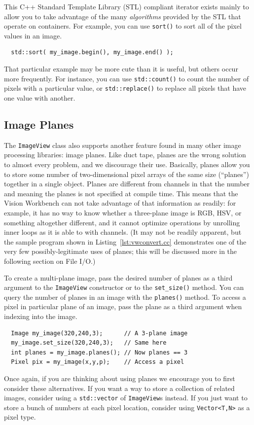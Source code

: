 This C++ Standard Template Library (STL) compliant iterator exists
mainly to allow you to take advantage of the many {\it algorithms}
provided by the STL that operate on containers.  For example, you can
use \verb#sort()# to sort all of the pixel values in an image.
\begin{verbatim}
  std::sort( my_image.begin(), my_image.end() );
\end{verbatim}
That particular example may be more cute than it is useful, but others
occur more frequently.  For instance, you can use \verb#std::count()# 
to count the number of pixels with a particular value, or
\verb#std::replace()# to replace all pixels that have one value with
another.

\subsection{Image Planes}

The \verb#ImageView# class also supports another feature found in many
other image processing libraries: image planes.  Like duct tape,
planes are the wrong solution to almost every problem, and we
discourage their use.  Basically, planes allow you to store some
number of two-dimensional pixel arrays of the same size (``planes'')
together in a single object.  Planes are different from channels in
that the number and meaning the planes is not specified at compile
time.  This means that the Vision Workbench can not take advantage of
that information as readily: for example, it has no way to know
whether a three-plane image is RGB, HSV, or something altogether
different, and it cannot optimize operations by unrolling inner loops
as it is able to with channels.  (It may not be readily apparent, but
the sample program shown in Listing~\ref{lst:vwconvert.cc}
demonstrates one of the very few possibly-legitimate uses of planes;
this will be discussed more in the following section on File I/O.)

To create a multi-plane image, pass the desired number of planes as a 
third argument to the \verb#ImageView# constructor or to the 
\verb#set_size()# method.  You can query the number of planes in an 
image with the \verb#planes()# method.  To access a pixel in particular 
plane of an image, pass the plane as a third argument when indexing 
into the image.
\begin{verbatim}
  Image my_image(320,240,3);      // A 3-plane image
  my_image.set_size(320,240,3);   // Same here
  int planes = my_image.planes(); // Now planes == 3
  Pixel pix = my_image(x,y,p);    // Access a pixel
\end{verbatim}
Once again, if you are thinking about using planes we encourage you to
first consider these alternatives.  If you want a way to store a
collection of related images, consider using a \verb#std::vector# of
\verb#ImageView#s instead.  If you just want to store a bunch of
numbers at each pixel location, consider using \verb#Vector<T,N># as a
pixel type.

